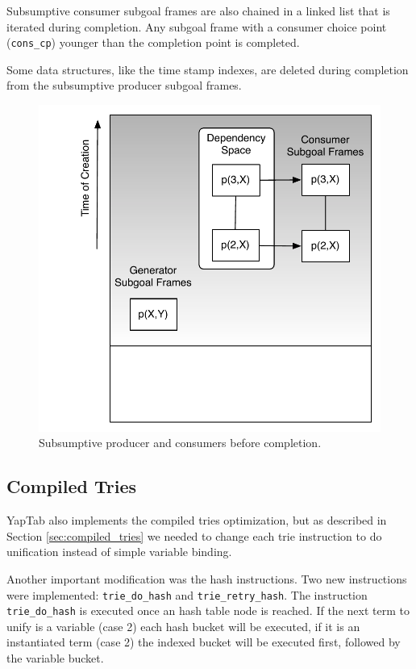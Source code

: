 Subsumptive consumer subgoal frames are also chained in a linked list
that is iterated during completion. Any subgoal frame with a consumer choice point (\texttt{cons\_cp})
younger than the completion point is completed.

Some data structures, like the time stamp indexes, are deleted during completion from the
subsumptive producer subgoal frames.

\begin{figure}[H]
  \centering
    \includegraphics[scale=0.6]{completion_space.pdf}
  \caption{Subsumptive producer and consumers before completion.}
  \label{fig:completion_space}
\end{figure}

\subsection{Compiled Tries}

YapTab also implements the compiled tries optimization, but as described in Section \ref{sec:compiled_tries}
we needed to change each trie instruction to do unification instead of simple variable binding.

Another important modification was the hash instructions. Two new instructions were
implemented: \texttt{trie\_do\_hash} and \texttt{trie\_retry\_hash}.
The instruction \texttt{trie\_do\_hash} is executed once an hash table node is reached.
If the next term to unify is a variable (case 2) each hash bucket will be executed, if it is an instantiated term (case 2)
the indexed bucket will be executed first, followed by the variable bucket.

